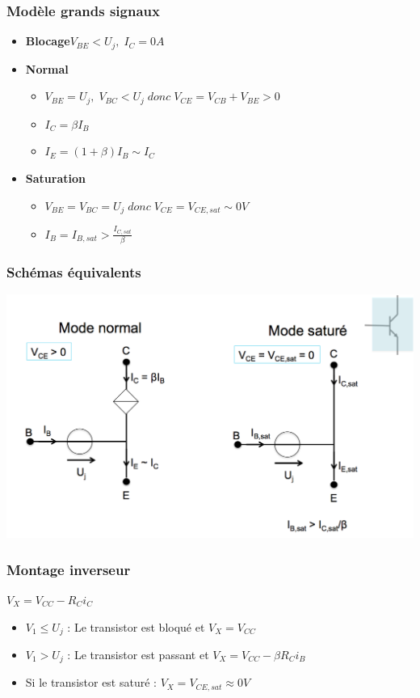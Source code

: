 \documentclass[]{article}
\begin{document}
\subsubsection {Modèle grands signaux}
\begin{itemize}
\item \textbf{Blocage}$ V_{BE} < U_j ,\; I_C = 0A$
\item \textbf{Normal} 
\begin{itemize}
\item $V_{BE} = U_j , \; V_{BC} < U_j \;donc\; V_{CE}=V_{CB} + V_{BE} > 0 $

\item $I_C = \beta I_B $

\item $ I_E = (1+\beta)I_B \sim I_C $
\end{itemize}

\item \textbf{Saturation} 
\begin{itemize}
\item $ V_{BE} = V_{BC} = U_j \; donc\; V_{CE} = V_{CE,sat} \sim 0V$
\item $ I_B = I_{B,sat} > \frac{I_{C,sat}}{\beta} $ 
\end{itemize}
\end{itemize}

\subsubsection{Schémas équivalents}
\includegraphics[scale=0.5]{schema_eq}
\subsubsection{Montage inverseur}
$V_X = V_{CC} - R_Ci_C$
\begin{itemize}
\item $V_1 \le U_j$ : Le transistor est bloqué et $V_X = V_{CC}$
\item $V_1 > U_j$ : Le transistor est passant et $V_X = V_{CC} - \beta R_Ci_B$
\item Si le transistor est saturé : $V_X = V_{CE,sat} \approx 0V$
\end{itemize}
\end{document}

